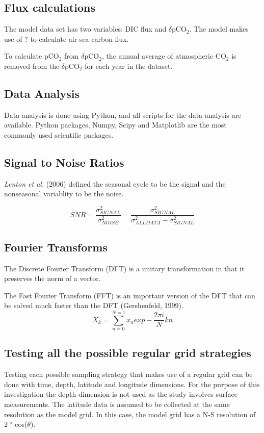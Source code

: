 \documentclass[11pt, a4paper]{article}
\numberwithin{figure}{section}
\numberwithin{table}{section}
\begin{document}
\subsection{Flux calculations}
The model data set has two variables: DIC flux and $\delta$pCO$_2$. 
The model makes use of ? to calculate air-sea carbon flux. 

To calculate pCO$_2$ from $\delta$pCO$_2$, the annual average of atmospheric
CO$_2$ is removed from the $\delta$pCO$_2$ for each year in the dataset.

\subsection{Data Analysis}
Data analysis is done using Python, and all scripts for the data analysis are 
available. Python packages, Numpy, Scipy and Matplotlib are the most commonly
used scientific packages.

\subsection{Signal to Noise Ratios}
\emph{Lenton et al.} (2006) defined the seasonal cycle to be the signal and the 
nonseasonal variablity to be the noise.

\begin{equation}
SNR = \frac{\sigma^2_{SIGNAL}}{\sigma^2_{NOISE}} = \frac{\sigma^2_{SIGNAL}}{\sigma^2_{ALLDATA} - \sigma^2_{SIGNAL}}
\end{equation}

\subsection{Fourier Transforms}
The Discrete Fourier Transform (DFT) is a unitary transformation in that it preserves
the norm of a vector. 

The Fast Fourier Transform (FFT) is an important 
version of the DFT that can be solved much faster than the DFT (Gershenfeld, 1999).
\begin{equation}
X{_k} = \sum_{n=0}^{N=1} x_{n} exp -\frac{2{\pi}i}{N}kn
\end{equation}

\subsection{Testing all the possible regular grid strategies}
Testing each possible sampling strategy that makes use of a regular grid can be
done with time, depth, latitude and longitude dimensions. For the purpose of 
this investigation the depth dimension is not used as the study involves 
surface measurements. The latitude data is assumed to be collected at the same 
resolution as the model grid. In this case, the model grid has a N-S resolution 
of 2 $^\circ$ cos($\theta$).
\end{document}
